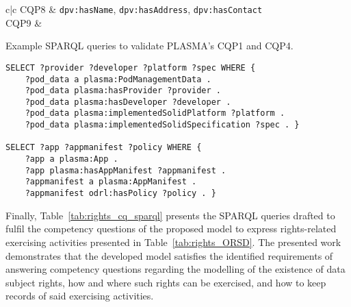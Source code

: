 \begin{table}[htp]
\begin{tabular}{c|c}
        \hline
        CQP8 & \texttt{dpv:hasName}, \texttt{dpv:hasAddress}, \texttt{dpv:hasContact} \\
        \hline
        CQP9 &  \\
    \end{tabular}
\end{table}

\begin{listing}[htp]
\caption{Example SPARQL queries to validate PLASMA's CQP1 and CQP4.}
\label{list:plasma_sparql_cq}
\begin{verbatim}
SELECT ?provider ?developer ?platform ?spec WHERE {
    ?pod_data a plasma:PodManagementData . 
    ?pod_data plasma:hasProvider ?provider . 
    ?pod_data plasma:hasDeveloper ?developer .
    ?pod_data plasma:implementedSolidPlatform ?platform .
    ?pod_data plasma:implementedSolidSpecification ?spec . }

SELECT ?app ?appmanifest ?policy WHERE {
    ?app a plasma:App . 
    ?app plasma:hasAppManifest ?appmanifest . 
    ?appmanifest a plasma:AppManifest .
    ?appmanifest odrl:hasPolicy ?policy . }
\end{verbatim}
\end{listing}

Finally, Table~\ref{tab:rights_cq_sparql} presents the SPARQL queries drafted to fulfil the competency questions of the proposed model to express rights-related exercising activities presented in Table~\ref{tab:rights_ORSD}.
The presented work demonstrates that the developed model satisfies the identified requirements of answering competency questions regarding the modelling of the existence of data subject rights, how and where such rights can be exercised, and how to keep records of said exercising activities.

